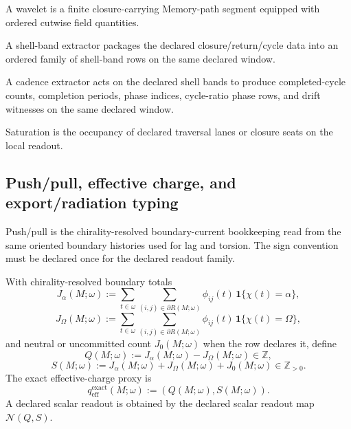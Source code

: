 \begin{definition}[Wavelet]
\label{def:wavelet}
A wavelet is a finite closure-carrying Memory-path segment equipped with ordered cutwise field quantities.
\end{definition}

\begin{definition}
\label{def:shell-cadence-interface}
A shell-band extractor packages the declared closure/return/cycle data into an ordered family of shell-band rows on the same declared window.
\end{definition}

\begin{definition}
\label{def:cadence-extractor}
A cadence extractor acts on the declared shell bands to produce completed-cycle counts, completion periods, phase indices, cycle-ratio phase rows, and drift witnesses on the same declared window.
\end{definition}

\begin{definition}[Saturation]
\label{def:saturation}
Saturation is the occupancy of declared traversal lanes or closure seats on the local readout.
\end{definition}

\subsection{Push/pull, effective charge, and export/radiation typing}
\begin{definition}
\label{def:push-pull-current}
Push/pull is the chirality-resolved boundary-current bookkeeping read from the same oriented boundary histories used for lag and torsion. The sign convention must be declared once for the declared readout family.
\end{definition}

\begin{definition}
\label{def:qeff}
With chirality-resolved boundary totals
\[
J_\alpha(M;\omega):=\sum_{t\in\omega}\sum_{(i,j)\in\partial R(M;\omega)} \phi_{ij}(t)\,\mathbf 1\{\chi(t)=\alpha\},
\]
\[
J_\Omega(M;\omega):=\sum_{t\in\omega}\sum_{(i,j)\in\partial R(M;\omega)} \phi_{ij}(t)\,\mathbf 1\{\chi(t)=\Omega\},
\]
and neutral or uncommitted count \(J_0(M;\omega)\) when the row declares it, define
\[
Q(M;\omega):=J_\alpha(M;\omega)-J_\Omega(M;\omega)\in\mathbb Z,
\]
\[
S(M;\omega):=J_\alpha(M;\omega)+J_\Omega(M;\omega)+J_0(M;\omega)\in\mathbb Z_{>0}.
\]
The exact effective-charge proxy is
\[
q_{\mathrm{eff}}^{\mathrm{exact}}(M;\omega):=(Q(M;\omega),S(M;\omega)).
\]
A declared scalar readout is obtained by the declared scalar readout map \(\mathcal N(Q,S)\).
\end{definition}

